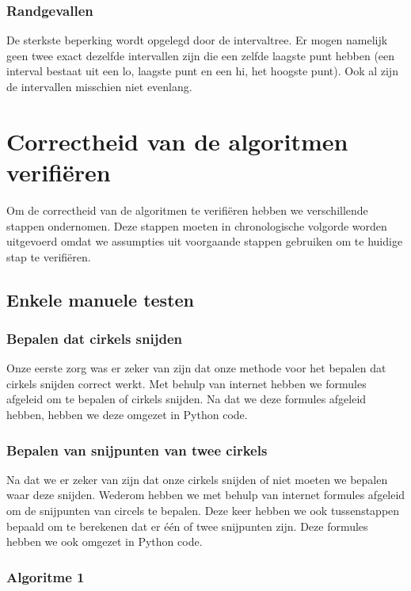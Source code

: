 \documentclass[11pt,a4paper]{article}
\begin{document}
\subsubsection{Randgevallen}
De sterkste beperking wordt opgelegd door de intervaltree. Er mogen namelijk geen twee exact dezelfde intervallen zijn die een zelfde laagste punt hebben (een interval bestaat uit een lo, laagste punt en een hi, het hoogste punt). Ook al zijn de intervallen misschien niet evenlang. 
\section{Correctheid van de algoritmen verifi\"eren}

Om de correctheid van de algoritmen te verifi\"eren hebben we verschillende stappen ondernomen. Deze stappen moeten in chronologische volgorde worden uitgevoerd omdat we assumpties uit voorgaande stappen gebruiken om te huidige stap te verifi\"eren.

\subsection{Enkele manuele testen}

\subsubsection{Bepalen dat cirkels snijden}
Onze eerste zorg was er zeker van zijn dat onze methode voor het bepalen dat cirkels snijden correct werkt. Met behulp van internet hebben we formules afgeleid om te bepalen of cirkels snijden. Na dat we deze formules afgeleid hebben, hebben we deze omgezet in Python code.

\subsubsection{Bepalen van snijpunten van twee cirkels}
Na dat we er zeker van zijn dat onze cirkels snijden of niet moeten we bepalen waar deze snijden. Wederom hebben we met behulp van internet formules afgeleid om de snijpunten van circels te bepalen. Deze keer hebben we ook tussenstappen bepaald om te berekenen dat er \'e\'en of twee snijpunten zijn. Deze formules hebben we ook omgezet in Python code.

\subsubsection{Algoritme 1}
\end{document}
